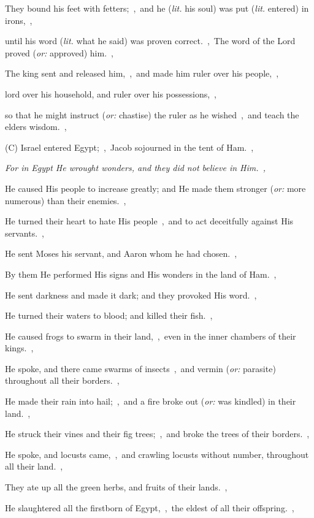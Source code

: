 \documentclass[12pt,twoside,a5paper]{article}
\newcommand{\translationoption}[1]{\emph{or:} #1}
\newcommand{\translationliteral}[1]{\emph{lit.} #1}
\begin{document}
\begin{normalparskip}
  They bound his feet with fetters;~\sep\ and he (\translationliteral{his soul}) was put (\translationliteral{entered}) in irons,~\sep

  until his word (\translationliteral{what he said}) was proven correct.~\sep\ The word of the Lord proved (\translationoption{approved}) him.~\sep

  The king sent and released him,~\sep\ and made him ruler over his people,~\sep

  lord over his household, and ruler over his possessions,~\sep

  so that he might instruct (\translationoption{chastise}) the ruler as he wished~\sep\ and teach the elders wisdom.~\sep

  (C) Israel entered Egypt;~\sep\ Jacob sojourned in the tent of Ham.~\sep

  \emph{For in Egypt He wrought wonders, and they did not believe in Him.~\sep}

  He caused His people to increase greatly; and He made them stronger (\translationoption{more numerous}) than their enemies.~\sep

  He turned their heart to hate His people~\sep\ and to act deceitfully against His servants.~\sep

  He sent Moses his servant, and Aaron whom he had chosen.~\sep

  By them He performed His signs and His wonders in the land of Ham.~\sep

  He sent darkness and made it dark; and they provoked His word.~\sep

  He turned their waters to blood; and killed their fish.~\sep

  He caused frogs to swarm in their land,~\sep\ even in the inner chambers of their kings.~\sep

  He spoke, and there came swarms of insects~\sep\ and vermin (\translationoption{parasite}) throughout all their borders.~\sep

  He made their rain into hail;~\sep\ and a fire broke out (\translationoption{was kindled}) in their land.~\sep

  He struck their vines and their fig trees;~\sep\ and broke the trees of their borders.~\sep

  He spoke, and locusts came,~\sep\ and crawling locusts without number, throughout all their land.~\sep

  They ate up all the green herbs, and fruits of their lands.~\sep

  He slaughtered all the firstborn of Egypt,~\sep\ the eldest of all their offspring.~\sep


\end{normalparskip}
\end{document}
